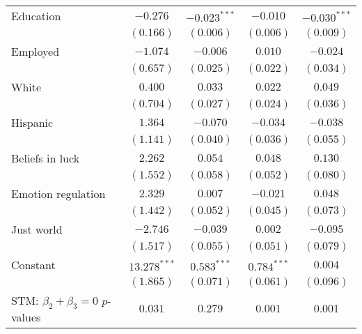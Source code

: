\begin{table}[!t]
\begin{center}
{\begin{threeparttable}
\begin{tabular}{l c c c c}
Education                                        & $-0.276$       & $-0.023^{***}$ & $-0.010$       & $-0.030^{***}$ \\
                                                 & $(0.166)$      & $(0.006)$      & $(0.006)$      & $(0.009)$      \\
Employed                                         & $-1.074$       & $-0.006$       & $0.010$        & $-0.024$       \\
                                                 & $(0.657)$      & $(0.025)$      & $(0.022)$      & $(0.034)$      \\
White                                            & $0.400$        & $0.033$        & $0.022$        & $0.049$        \\
                                                 & $(0.704)$      & $(0.027)$      & $(0.024)$      & $(0.036)$      \\
Hispanic                                         & $1.364$        & $-0.070$       & $-0.034$       & $-0.038$       \\
                                                 & $(1.141)$      & $(0.040)$      & $(0.036)$      & $(0.055)$      \\
Beliefs in luck                                  & $2.262$        & $0.054$        & $0.048$        & $0.130$        \\
                                                 & $(1.552)$      & $(0.058)$      & $(0.052)$      & $(0.080)$      \\
Emotion regulation                               & $2.329$        & $0.007$        & $-0.021$       & $0.048$        \\
                                                 & $(1.442)$      & $(0.052)$      & $(0.045)$      & $(0.073)$      \\
Just world                                       & $-2.746$       & $-0.039$       & $0.002$        & $-0.095$       \\
                                                 & $(1.517)$      & $(0.055)$      & $(0.051)$      & $(0.079)$      \\
Constant                                         & $13.278^{***}$ & $0.583^{***}$  & $0.784^{***}$  & $0.004$        \\
                                                 & $(1.865)$      & $(0.071)$      & $(0.061)$      & $(0.096)$      \\
\midrule
STM: $\beta_2 + \beta_3 = 0$ $p$-values          & $0.031$        & $0.279$        & $0.001$        & $0.001$        \\

\end{tabular}
\end{threeparttable}}
\end{center}
\end{table}
